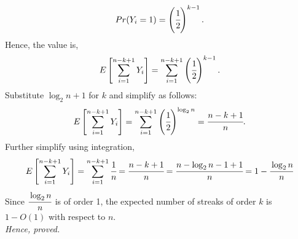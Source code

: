 \documentclass{article}
\begin{document}
\begin{enumerate}
\begin{enumerate}
            \[
                Pr(Y_i = 1) = \left(\cfrac{1}{2}\right)^{k-1}.
            \]
            Hence, the value is,
            \[
                E\left[\sum_{i=1}^{n-k+1} Y_i\right] = \sum_{i=1}^{n-k+1} \left(\cfrac{1}{2}\right)^{k-1}.
            \]
            Substitute \( \log_2 n + 1 \) for \( k \) and simplify as follows:
            \[
                E\left[\sum_{i=1}^{n-k+1} Y_i\right] = \sum_{i=1}^{n-k+1} \left(\cfrac{1}{2}\right)^{\log_2 n} = \cfrac{n-k+1}{n}.
            \]
            Further simplify using integration,
            \[
                E\left[\sum_{i=1}^{n-k+1} Y_i\right] = \sum_{i=1}^{n-k+1} \cfrac{1}{n} = \cfrac{n-k+1}{n} = \cfrac{n - \log_2 n - 1 + 1}{n} = 1 - \cfrac{\log_2 n}{n}
            \]
            Since \(\cfrac{\log_2 n}{n}\) is of order 1, the expected number of streaks of order \(k\) is \(1 - O(1)\) with respect to \(n\).\\
            \textit{Hence, proved.}
    

\end{enumerate}
\end{enumerate}
\end{document}
